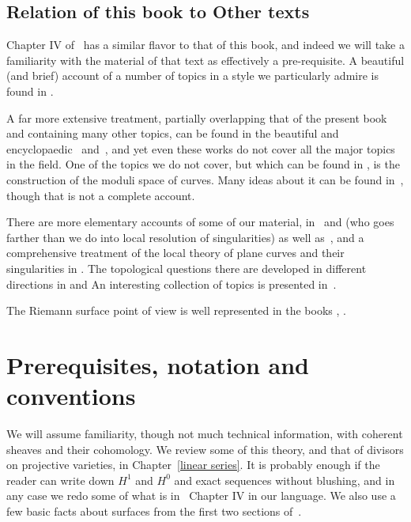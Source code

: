 \subsection{Relation of this book to Other texts} 
Chapter IV of~\cite{Hartshorne1977} has a similar flavor to that of this book, and indeed we will take a familiarity with the material of that text as effectively a pre-requisite. A beautiful (and brief) account of a number of topics in a style we particularly admire is found in \cite{MumfordCJ}.

A far more extensive treatment, partially overlapping that of the present book and containing many other topics, can be found in the beautiful and encyclopaedic~\cite{ACGH} and~\cite{ACG}, and yet even these works do not cover all the major topics in the field. 
One of the topics we do not cover, but which can be found in \cite{ACG}, is the construction of the moduli space of curves. Many  ideas  about it can be found in~\cite{HarrisMorrison1998}, though  that is not a complete account. 

There are more elementary accounts of some of our material, in~\cite{Fulton1989} and \cite{Walker1978} (who goes farther than we do into local resolution of singularities) as well as~\cite{Griffiths-curves}, and a comprehensive treatment of the local theory of plane curves and their singularities in \cite{Brieskorn1986}. The topological questions there are developed in different directions in \cite{MR0239612} %
 and \cite{MR817982}%
 An interesting collection of topics is presented in~\cite{Clemens-Scrapbook}.

 The Riemann surface point of view is well represented in the books \cite{Forster} \cite{Gunning}, \cite{Gunning-2} \cite{Kirwan}\cite{Miranda}. 


\section{Prerequisites, notation and conventions}

We will assume familiarity, though not much technical information, with coherent sheaves and their cohomology. We review some of this theory, and that of divisors on projective 
varieties, in Chapter~\ref{linear series}. It is probably enough if the reader can write down $H^1$ and $H^0$ and exact sequences without blushing, and in any case we redo some of what is in~\cite[Chapter IV]{Hartshorne1977}  Chapter IV in our language. We also use a few basic facts about surfaces from the first two sections of~\cite[Chapter IV]{Hartshorne1977}.

